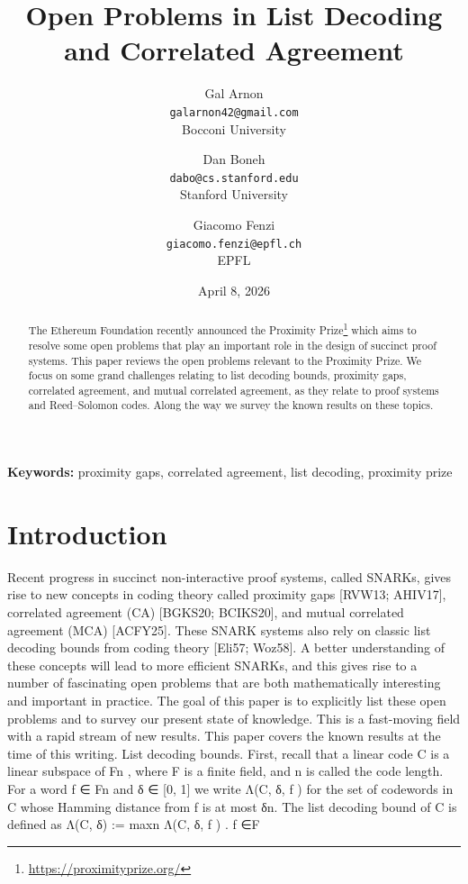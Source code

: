 \documentclass[11pt]{article}
\title{Open Problems in List Decoding and Correlated Agreement}
\author{Gal Arnon\\\texttt{galarnon42@gmail.com}\\Bocconi University
\and Dan Boneh\\\texttt{dabo@cs.stanford.edu}\\Stanford University
\and Giacomo Fenzi\\\texttt{giacomo.fenzi@epfl.ch}\\EPFL}
\date{April 8, 2026}
\begin{document}
\maketitle

\begin{abstract}
The Ethereum Foundation recently announced the Proximity Prize\footnote{\url{https://proximityprize.org/}} which aims to resolve some open problems that play an important role in the design of succinct proof systems. This paper reviews the open problems relevant to the Proximity Prize. We focus on some grand challenges relating to list decoding bounds, proximity gaps, correlated agreement, and mutual correlated agreement, as they relate to proof systems and Reed--Solomon codes. Along the way we survey the known results on these topics.
\end{abstract}

\noindent\textbf{Keywords:} proximity gaps, correlated agreement, list decoding, proximity prize

\tableofcontents
\newpage

\section{Introduction}



Recent progress in succinct non-interactive proof systems, called SNARKs, gives rise to new concepts in coding theory called proximity gaps [RVW13; AHIV17], correlated agreement (CA) [BGKS20;
BCIKS20], and mutual correlated agreement (MCA) [ACFY25]. These SNARK systems also rely
on classic list decoding bounds from coding theory [Eli57; Woz58]. A better understanding of these
concepts will lead to more efficient SNARKs, and this gives rise to a number of fascinating open
problems that are both mathematically interesting and important in practice.
The goal of this paper is to explicitly list these open problems and to survey our present state
of knowledge. This is a fast-moving field with a rapid stream of new results. This paper covers the
known results at the time of this writing.
List decoding bounds. First, recall that a linear code C is a linear subspace of Fn , where F is
a finite field, and n is called the code length. For a word f ∈ Fn and δ ∈ [0, 1] we write Λ(C, δ, f )
for the set of codewords in C whose Hamming distance from f is at most δn. The list decoding
bound of C is defined as
Λ(C, δ) := maxn Λ(C, δ, f ) .
f ∈F
\end{document}
